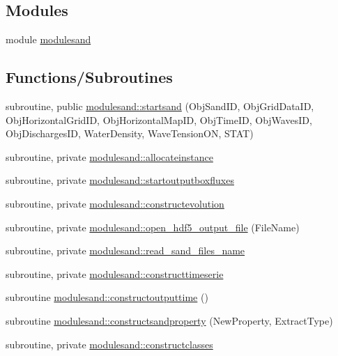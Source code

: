 \subsection*{Modules}
\begin{DoxyCompactItemize}
\item 
module \mbox{\hyperlink{namespacemodulesand}{modulesand}}
\end{DoxyCompactItemize}
\subsection*{Functions/\+Subroutines}
\begin{DoxyCompactItemize}
\item 
subroutine, public \mbox{\hyperlink{namespacemodulesand_a40b3b2fd3451026e5dc113c11bf6ad57}{modulesand\+::startsand}} (Obj\+Sand\+ID, Obj\+Grid\+Data\+ID, Obj\+Horizontal\+Grid\+ID, Obj\+Horizontal\+Map\+ID, Obj\+Time\+ID, Obj\+Waves\+ID, Obj\+Discharges\+ID, Water\+Density, Wave\+Tension\+ON, S\+T\+AT)
\item 
subroutine, private \mbox{\hyperlink{namespacemodulesand_ad161b287427b9612e9e73f0e7cb2b2ec}{modulesand\+::allocateinstance}}
\item 
subroutine, private \mbox{\hyperlink{namespacemodulesand_a26a45201fee3769e27ba13227a832a22}{modulesand\+::startoutputboxfluxes}}
\item 
subroutine, private \mbox{\hyperlink{namespacemodulesand_a82762171a1b3adfea24df5d01e91490e}{modulesand\+::constructevolution}}
\item 
subroutine, private \mbox{\hyperlink{namespacemodulesand_a508ae0cf41ca1a4046aa378241b38e19}{modulesand\+::open\+\_\+hdf5\+\_\+output\+\_\+file}} (File\+Name)
\item 
subroutine, private \mbox{\hyperlink{namespacemodulesand_af5d461af239929ac66d30206f4a6d982}{modulesand\+::read\+\_\+sand\+\_\+files\+\_\+name}}
\item 
subroutine, private \mbox{\hyperlink{namespacemodulesand_a32501716978e666f3e0a16150986c209}{modulesand\+::constructtimeserie}}
\item 
subroutine \mbox{\hyperlink{namespacemodulesand_a0db362913d03be6c3ddaab19327561ce}{modulesand\+::constructoutputtime}} ()
\item 
subroutine \mbox{\hyperlink{namespacemodulesand_a04230d24a80d765152f92115bc61d5c4}{modulesand\+::constructsandproperty}} (New\+Property, Extract\+Type)
\item 
subroutine, private \mbox{\hyperlink{namespacemodulesand_a83a39e6e7dea7526131ca5a256383f63}{modulesand\+::constructclasses}}

\end{DoxyCompactItemize}

